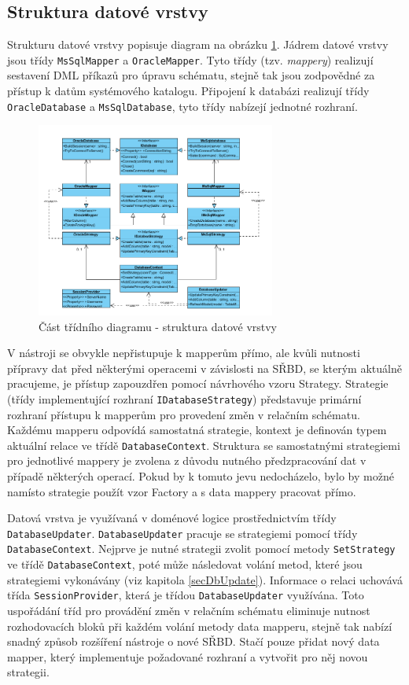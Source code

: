 \documentclass[czech,bachelor,public,dept460,male,oneside]{diploma}
\begin{document}
		
	\subsection{Struktura datové vrstvy}
	Strukturu datové vrstvy popisuje diagram na obrázku \ref{fig:classDiagSync}. Jádrem datové vrstvy jsou třídy \texttt{MsSqlMapper} a \texttt{OracleMapper}. Tyto třídy (tzv. \emph{mappery}) realizují sestavení DML příkazů pro úpravu schématu, stejně tak jsou zodpovědné za přístup k datům systémového katalogu. Připojení k databázi realizují třídy \texttt{OracleDatabase} a \texttt{MsSqlDatabase}, tyto třídy nabízejí jednotné rozhraní. 
	
	\begin{figure}[H]
		\centering
		\includegraphics[width=0.70\textwidth]{Figures/EditorSync}
		\caption{Část třídního diagramu - struktura datové vrstvy}
		\label{fig:classDiagSync}
	\end{figure}
	
	V nástroji se obvykle nepřistupuje k mapperům přímo, ale kvůli nutnosti přípravy dat před některými operacemi v závislosti na SŘBD, se kterým aktuálně pracujeme, je přístup zapouzdřen pomocí návrhového vzoru Strategy. Strategie (třídy implementující rozhraní \texttt{IDatabaseStrategy}) představuje primární rozhraní přístupu k mapperům pro provedení změn v relačním schématu. Každému mapperu odpovídá samostatná strategie, kontext je definován typem aktuální relace ve třídě \texttt{DatabaseContext}. Struktura se samostatnými strategiemi pro jednotlivé mappery je zvolena z důvodu nutného předzpracování dat v případě některých operací. Pokud by k tomuto jevu nedocházelo, bylo by možné namísto strategie použít vzor Factory a s data mappery pracovat přímo. 
	
	Datová vrstva je využívaná v doménové logice prostřednictvím třídy \texttt{DatabaseUpdater}. \texttt{DatabaseUpdater} pracuje se strategiemi pomocí třídy \texttt{DatabaseContext}. Nejprve je nutné strategii zvolit pomocí metody \texttt{SetStrategy} ve třídě \texttt{DatabaseContext}, poté může následovat volání metod, které jsou strategiemi vykonávány (viz kapitola \ref{secDbUpdate}). Informace o relaci uchovává třída \texttt{SessionProvider}, která je třídou \texttt{DatabaseUpdater} využívána. Toto uspořádání tříd pro provádění změn v relačním schématu eliminuje nutnost rozhodovacích bloků při každém volání metody data mapperu, stejně tak nabízí snadný způsob rozšíření nástroje o nové SŘBD. Stačí pouze přidat nový data mapper, který implementuje požadované rozhraní a vytvořit pro něj novou strategii.
	
\end{document}

